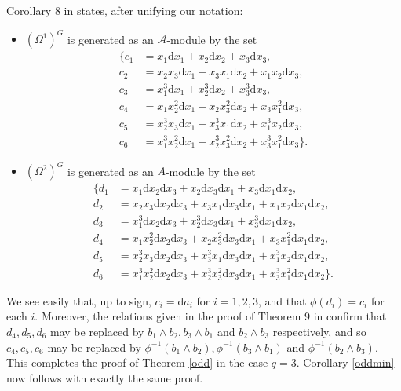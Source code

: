 \documentclass[a4paper]{amsart}
\newcommand{\dd}{\mathrm{d}}
\newtheorem*{Corollary of Conjecture}{Corollary of Conjecture}
\theoremstyle{definition}
\theoremstyle{remark}
\theoremstyle{Acknowledgments}
\begin{document}
Corollary 8 in \cite{ElmerMeyer} states, after unifying our notation:
\begin{itemize}
\item[(a)] $(\Omega^1)^G$ is generated as an $\mathcal{A}$-module by the set
\begin{align*} \{c_1 &= x_1 \dd x_1+x_2\dd x_2+x_3\dd x_3,\\
c_2 &= x_2x_3\dd x_1+x_3x_1\dd x_2+x_1x_2\dd x_3,\\
c_3 &= x_1^3\dd x_1+x_2^3\dd x_2+x_3^3\dd x_3,\\
c_4 &=x_1x_2^2\dd x_1+x_2x_3^2\dd x_2+x_3x_1^2\dd x_3,\\
c_5 &= x_2^3x_3\dd x_1+x_3^3x_1\dd x_2+x_1^3x_2\dd x_3,\\
c_6 &= x_1^3x_2^2\dd x_1+x_2^3x_3^2\dd x_2+x_3^3x_1^2\dd x_3\}.\end{align*}
\item[(b)]  $(\Omega^2)^G$ is generated as an $A$-module by the set
\begin{align*} \{d_1 &= x_1\dd x_2\dd x_3+x_2\dd x_3\dd x_1+x_3\dd x_1\dd x_2,\\ 
d_2 &= x_2x_3\dd x_2\dd x_3+x_3x_1\dd x_3\dd x_1+x_1x_2\dd x_1\dd x_2,\\
d_3 &= x_1^3\dd x_2\dd x_3+x_2^3\dd x_3\dd x_1+x_3^3\dd x_1\dd x_2,\\
d_4 &=x_1x_2^2\dd x_2\dd x_3+x_2x_3^2\dd x_3\dd x_1+x_3x_1^2\dd x_1\dd x_2,\\
d_5 &= x_2^3x_3\dd x_2\dd x_3+x_3^3x_1\dd x_3\dd x_1+x_1^3x_2\dd x_1\dd x_2,\\
d_6 &= x_1^3x_2^2\dd x_2\dd x_3+x_2^3x_3^2\dd x_3\dd x_1+x_3^3x_1^2\dd x_1\dd x_2\}.\end{align*}
\end{itemize}

We see easily that, up to sign, $c_i = \dd a_i$ for $i=1,2,3$, and that $\phi(d_i)=c_i$ for each $i$. Moreover, the relations given in the proof of Theorem 9 in \cite{ElmerMeyer} confirm that $d_4,d_5,d_6$ may be replaced by $b_1 \wedge b_2, b_3 \wedge b_1$ and $b_2 \wedge b_3$ respectively, and so $c_4,c_5,c_6$ may be replaced by $\phi^{-1}(b_1 \wedge b_2), \phi^{-1}(b_3 \wedge b_1)$ and $\phi^{-1}(b_2 \wedge b_3)$. This completes the proof of Theorem \ref{odd} in the case $q=3$. Corollary \ref{oddmin} now follows with exactly the same proof.




\end{document}
